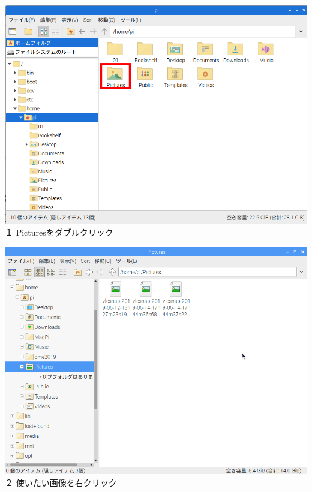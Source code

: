 \documentclass[a4paper,12pt]{jarticle}
\begin{document}
\begin{minipage}{0.45\linewidth}
  \includegraphics[width=\linewidth]{textbook-img164.png}
  \newline
  １ Picturesをダブルクリック
\end{minipage}
\hspace{10mm}
\begin{minipage}{0.45\linewidth}
  \includegraphics[width=\linewidth]{textbook-img162.png}
  \newline
  ２ 使いたい画像を右クリック
\end{minipage}

\bigskip
\end{document}
